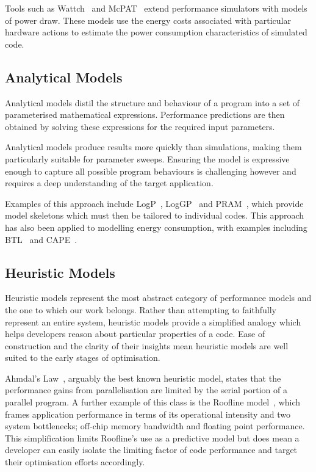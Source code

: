 Tools such as Wattch~\cite{brooks:2000aa} and McPAT~\cite{li:2009aa} extend performance simulators with models of power draw.
These models use the energy costs associated with particular hardware actions to estimate the power consumption characteristics of simulated code.

\subsection{Analytical Models} 
\noindent
Analytical models distil the structure and behaviour of a program into a set of parameterised mathematical expressions.
Performance predictions are then obtained by solving these expressions for the required input parameters.

Analytical models produce results more quickly than simulations, making them particularly suitable for parameter sweeps.
Ensuring the model is expressive enough to capture all possible program behaviours is challenging however and requires a deep understanding of the target application.

Examples of this approach include LogP~\cite{culler:1993aa}, LogGP~\cite{alexandrov:1997aa} and PRAM~\cite{karp:1991aa}, which provide model skeletons which must then be tailored to individual codes.
This approach has also been applied to modelling energy consumption, with examples including BTL~\cite{manousakis:2012aa} and CAPE~\cite{kamble:1997aa}.

\subsection{Heuristic Models}
\noindent
Heuristic models represent the most abstract category of performance models and the one to which our work belongs.
Rather than attempting to faithfully represent an entire system, heuristic models provide a simplified analogy which helps developers reason about particular properties of a code.
Ease of construction and the clarity of their insights mean heuristic models are well suited to the early stages of optimisation.

Ahmdal's Law~\cite{amdahl:1967aa}, arguably the best known heuristic model, states that the performance gains from parallelisation are limited by the serial portion of a parallel program.
A further example of this class is the Roofline model~\cite{williams:2009aa}, which frames application performance in terms of its operational intensity and two system bottlenecks; off-chip memory bandwidth and floating point performance.
This simplification limits Roofline's use as a predictive model but does mean a developer can easily isolate the limiting factor of code performance and target their optimisation efforts accordingly.

